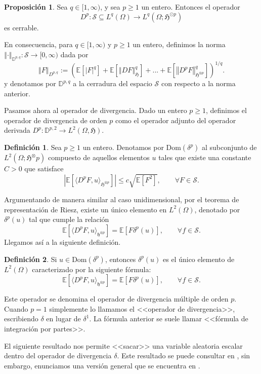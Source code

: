 \documentclass[letterpaper,twoside,12pt]{book}
\newcommand{\D}{\mathbb{D}}
\renewcommand{\S}{\mathcal{S}}
\newcommand{\E}{\mathbb{E}}
\newcommand{\1}{\mathds{1}}
\newcommand{\abs}[1]{\left\lvert #1 \right\rvert}
\renewcommand{\to}{\rightarrow}
\newcommand{\norm}[1]{\left\Vert #1 \right\Vert}
\theoremstyle{definition}
\newtheorem{dfn}{Definición}
\theoremstyle{definition}
\theoremstyle{remark}
\theoremstyle{definition}
\theoremstyle{definition}
\newtheorem{prop}{Proposición}
\theoremstyle{definition}
\theoremstyle{definition}
\theoremstyle{definition}
\begin{document}
 \begin{prop} 
  Sea $q\in [1,\infty)$, y sea $p\geq 1$ un entero. Entonces el operador 
  \[
  D^{p}:\S\subseteq L^q(\Omega)\to L^q(\Omega;\mathfrak{H}^{\odot p})
  \]
  es cerrable.
  \end{prop}
En consecuencia, para $q\in [1,\infty)$ y $p\geq1$ un entero, definimos la norma $\norm{\cdot}_{\D^{p,q}}:\S\to [0,\infty)$ dada por 
\[
\norm{F}_{D^{p,q}}:= \left(\E\left[\abs{F}^{q}\right]+\E\left[\norm{DF}^{q}_{\mathfrak{H}}\right]+...+\E\left[\norm{D^pF}_{\mathfrak{H}^{\otimes p}}^q\right]\right)^{1/q}.
\]
y denotamos por $\D^{p,q}$ a la cerradura del espacio $\S$ con respecto a la norma anterior.

Pasamos ahora al operador de divergencia. Dado un entero $p\geq1$, definimos el operador de divergencia de orden $p$ como el operador adjunto del operador derivada $D^{p}:\D^{p,2}\to L^{2}(\Omega,\mathfrak{H})$.

\begin{dfn} 
 Sea $p\geq1$ un entero. Denotamos por $\text{Dom}(\delta^p)$ al subconjunto de $L^2(\Omega;\mathfrak{H}^\otimes p)$ compuesto de aquellos elementos $u$ tales que existe una constante $C>0$ que satisface 
 \[
 \abs{\E\left[\langle D^pF,u\rangle_{\mathfrak{H}^{\otimes p}}\right]}\leq c\sqrt{\E\left[F^2\right]}, \qquad \forall F \in \S.
 \]
 \end{dfn}
 Argumentando de manera similar al caso unidimensional, por el teorema de representación de Riesz, existe un único elemento en $L^2(\Omega)$, denotado por $\delta^p(u)$ tal que cumple la relación 
 \[
 \E\left[\langle D^pF,u\rangle_{\mathfrak{h}^{\otimes p}}\right]=\E\left[F\delta^{p}(u)\right], \qquad \forall f\in \S.
 \]
 Llegamos así a la siguiente definición.

 \begin{dfn} 
  Si $u\in \text{Dom}(\delta^p)$, entonces $\delta^p(u)$ es el único elemento de $L^2(\Omega)$ caracterizado por la siguiente fórmula:
\[
 \E\left[\langle D^pF,u\rangle_{\mathfrak{h}^{\otimes p}}\right]=\E\left[F\delta^{p}(u)\right], \qquad \forall f\in \S.
 \]
  \end{dfn}
Este operador se denomina el operador de divergencia múltiple de orden $p$. Cuando $p=1$ simplemente lo llamamos el <<operador de divergencia>>,  escribiendo $\delta$ en lugar de $\delta^1$. La fórmula anterior se suele llamar <<fórmula de integración por partes>>.

El siguiente resultado nos permite <<sacar>> una variable aleatoria escalar dentro del operador de divergencia $\delta$. Este resultado se puede consultar en \cite[proposición 2.5.4]{Nourdin_Peccati_2012}, sin embargo, enunciamos una versión general que se encuentra en \cite[lema 1]{Caballero1998-hz}.
\end{document}
